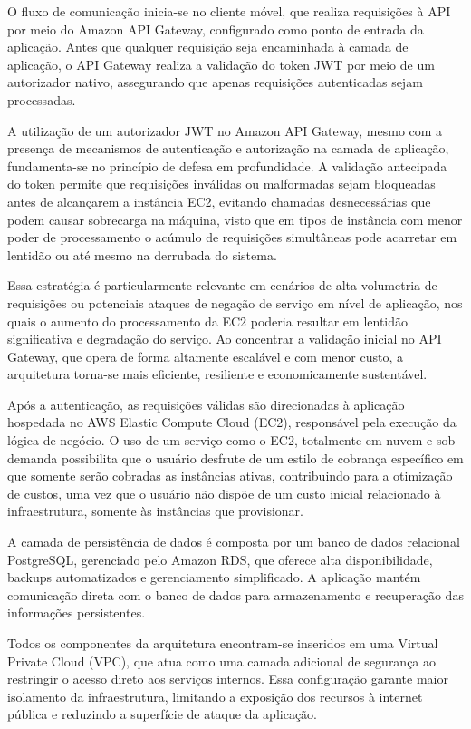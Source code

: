 O fluxo de comunicação inicia-se no cliente móvel, que realiza requisições à API por meio do Amazon API Gateway, configurado como ponto de entrada da aplicação. Antes que qualquer requisição seja encaminhada à camada de aplicação, o API Gateway realiza a validação do token JWT por meio de um autorizador nativo, assegurando que apenas requisições autenticadas sejam processadas.

A utilização de um autorizador JWT no Amazon API Gateway, mesmo com a presença de mecanismos de autenticação e autorização na camada de aplicação, fundamenta-se no princípio de defesa em profundidade. A validação antecipada do token permite que requisições inválidas ou malformadas sejam bloqueadas antes de alcançarem a instância EC2, evitando chamadas desnecessárias que podem causar sobrecarga na máquina, visto que em tipos de instância com menor poder de processamento o acúmulo de requisições simultâneas pode acarretar em lentidão ou até mesmo na derrubada do sistema.

Essa estratégia é particularmente relevante em cenários de alta volumetria de requisições ou potenciais ataques de negação de serviço em nível de aplicação, nos quais o aumento do processamento da EC2 poderia resultar em lentidão significativa e degradação do serviço. Ao concentrar a validação inicial no API Gateway, que opera de forma altamente escalável e com menor custo, a arquitetura torna-se mais eficiente, resiliente e economicamente sustentável.

Após a autenticação, as requisições válidas são direcionadas à aplicação hospedada no AWS Elastic Compute Cloud (EC2), responsável pela execução da lógica de negócio. O uso de um serviço como o EC2, totalmente em nuvem e sob demanda possibilita que o usuário desfrute de um estilo de cobrança específico em que somente serão cobradas as instâncias ativas, contribuindo para a otimização de custos, uma vez que o usuário não dispõe de um custo inicial relacionado à infraestrutura, somente às instâncias que provisionar.

A camada de persistência de dados é composta por um banco de dados relacional PostgreSQL, gerenciado pelo Amazon RDS, que oferece alta disponibilidade, backups automatizados e gerenciamento simplificado. A aplicação mantém comunicação direta com o banco de dados para armazenamento e recuperação das informações persistentes.

Todos os componentes da arquitetura encontram-se inseridos em uma Virtual Private Cloud (VPC), que atua como uma camada adicional de segurança ao restringir o acesso direto aos serviços internos. Essa configuração garante maior isolamento da infraestrutura, limitando a exposição dos recursos à internet pública e reduzindo a superfície de ataque da aplicação.

